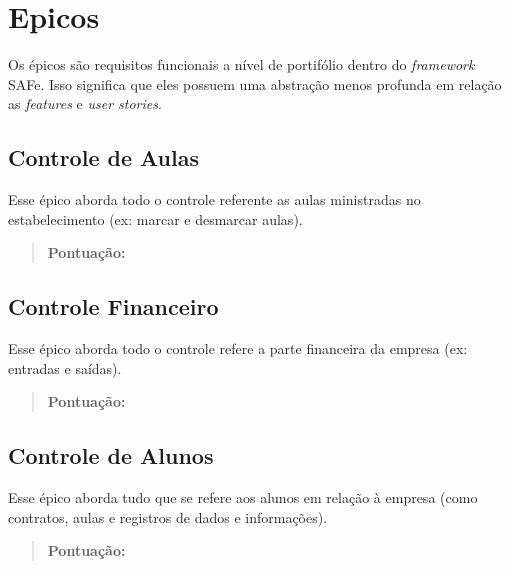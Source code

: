 \section[Epicos]{Epicos}
Os épicos são requisitos funcionais a nível de portifólio dentro do
\textsl{framework} SAFe. Isso significa que eles possuem uma abstração menos profunda em relação
as \textsl{features} e \textsl{user stories}.

\subsection[Controle de Aulas]{Controle de Aulas}
Esse épico aborda todo o controle referente as aulas ministradas no estabelecimento (ex: marcar e desmarcar aulas).
\begin{quote}
    \textbf{Pontuação:}
\end{quote}

\subsection[Controle Financeiro]{Controle Financeiro}
Esse épico aborda todo o controle refere a parte financeira da empresa (ex: entradas e saídas).
\begin{quote}
    \textbf{Pontuação:}
\end{quote}

\subsection[Controle de Alunos]{Controle de Alunos}
Esse épico aborda tudo que se refere aos alunos em relação à empresa (como contratos, aulas e registros de dados e informações).
\begin{quote}
    \textbf{Pontuação:}
\end{quote}
